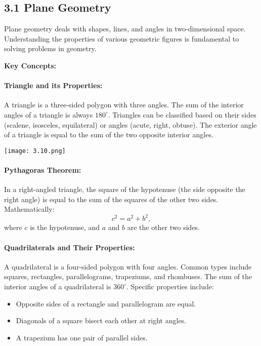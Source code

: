 
\subsection*{3.1 Plane Geometry}
Plane geometry deals with shapes, lines, and angles in two-dimensional space. Understanding the properties of various geometric figures is fundamental to solving problems in geometry.

\textbf{Key Concepts:}

\paragraph{Triangle and its Properties:} A triangle is a three-sided polygon with three angles. The sum of the interior angles of a triangle is always $180^\circ$. Triangles can be classified based on their sides (scalene, isosceles, equilateral) or angles (acute, right, obtuse). The exterior angle of a triangle is equal to the sum of the two opposite interior angles.
\begin{center}
	\texttt{[image: 3.10.png]}
\end{center}


\paragraph{Pythagoras Theorem:} In a right-angled triangle, the square of the hypotenuse (the side opposite the right angle) is equal to the sum of the squares of the other two sides. Mathematically:
\[
c^2 = a^2 + b^2,
\]
where $c$ is the hypotenuse, and $a$ and $b$ are the other two sides.

\paragraph{Quadrilaterals and Their Properties:} A quadrilateral is a four-sided polygon with four angles. Common types include squares, rectangles, parallelograms, trapeziums, and rhombuses. 
The sum of the interior angles of a quadrilateral is $360^\circ$. Specific properties include:
\begin{itemize}
	\item Opposite sides of a rectangle and parallelogram are equal.
	\item Diagonals of a square bisect each other at right angles.
	\item A trapezium has one pair of parallel sides.
\end{itemize}

